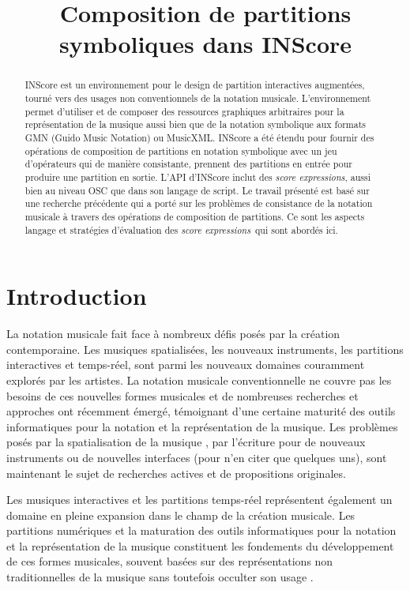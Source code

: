 \documentclass{article}
\title{Composition de partitions symboliques dans INScore}
\newcommand{\sExprs}{\emph{score expressions}}
\begin{document}
%
\maketitle
%
\begin{abstract}
INScore est un environnement pour le design de partition interactives augmentées, tourné vers des usages non conventionnels de la notation musicale. L'environnement permet d'utiliser et de composer des ressources graphiques arbitraires pour la représentation de la musique aussi bien que de la notation symbolique aux formats GMN (Guido Music Notation) ou MusicXML. INScore a été étendu pour fournir des opérations de composition de partitions en notation symbolique avec un jeu d'opérateurs qui de manière consistante, prennent des partitions en entrée pour produire une partition en sortie. L'API d'INScore inclut des \sExprs , aussi bien au niveau OSC que dans son langage de script. 
Le travail présenté est basé sur une recherche précédente qui a porté sur les problèmes de consistance de la notation musicale à travers des opérations de composition de partitions. Ce sont les aspects langage et stratégies d'évaluation des \sExprs\ qui sont abordés ici.
\end{abstract}

\section{Introduction}\label{sec:introduction}

La notation musicale fait face à nombreux défis posés par la création contemporaine. Les musiques spatialisées, les nouveaux instruments, les partitions interactives et temps-réel, sont parmi les nouveaux domaines couramment explorés par les artistes. 
La notation musicale conventionnelle ne couvre pas les besoins de ces nouvelles formes musicales et de nombreuses recherches et approches ont récemment émergé, témoignant d'une certaine maturité des outils informatiques pour la notation et la représentation de la musique. Les problèmes posés par la spatialisation de la musique \cite{Ellberger_tenor2015}, par l'écriture pour de nouveaux instruments \cite{tmays:2014} ou de nouvelles interfaces  \cite{kschlei:2015} (pour n'en citer que quelques uns), sont maintenant le sujet de recherches actives et de propositions originales.

Les musiques interactives et les partitions temps-réel représentent également un domaine en pleine expansion dans le champ de la création musicale. Les partitions numériques et la maturation des outils informatiques pour la notation et la représentation de la musique constituent les fondements du développement de ces formes musicales, souvent basées sur des représentations non traditionnelles de la musique \cite{RSmith_tenor2015, Hope_tenor2015} sans toutefois occulter son usage \cite{Hoadley12,hoadley14}. 
\end{document}

